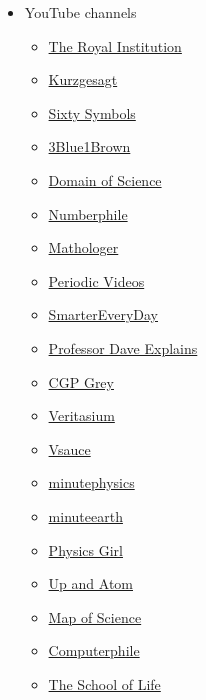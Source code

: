 \documentclass{article}
\begin{document}
\begin{itemize}
    \item YouTube channels
    \begin{itemize}
    \item \href{https://www.youtube.com/user/TheRoyalInstitution}{The Royal Institution}
    \item \href{https://www.youtube.com/user/Kurzgesagt}{Kurzgesagt}
    \item \href{https://www.youtube.com/user/sixtysymbols}{Sixty Symbols}
    \item \href{https://www.youtube.com/channel/UCYO_jab_esuFRV4b17AJtAw}{3Blue1Brown}
    \item \href{https://www.youtube.com/channel/UCxqAWLTk1CmBvZFPzeZMd9A}{Domain of Science}
    \item \href{https://www.youtube.com/channel/UCoxcjq-8xIDTYp3uz647V5A}{Numberphile}
    \item \href{https://www.youtube.com/channel/UC1_uAIS3r8Vu6JjXWvastJg}{Mathologer}
    \item \href{https://www.youtube.com/channel/UCtESv1e7ntJaLJYKIO1FoYw}{Periodic Videos}
    \item \href{https://www.youtube.com/channel/UC6107grRI4m0o2-emgoDnAA}{SmarterEveryDay}
    \item \href{https://www.youtube.com/channel/UC0cd_-e49hZpWLH3UIwoWRA}{Professor Dave Explains}
    \item \href{https://www.youtube.com/channel/UC2C_jShtL725hvbm1arSV9w}{CGP Grey}
    \item \href{https://www.youtube.com/user/1veritasium}{Veritasium}
    \item \href{https://www.youtube.com/channel/UC6nSFpj9HTCZ5t-N3Rm3-HA}{Vsauce}
    \item \href{https://www.youtube.com/user/minutephysics}{minutephysics}
    \item \href{https://www.youtube.com/minuteearth}{minuteearth}
    \item \href{https://www.youtube.com/channel/UC7DdEm33SyaTDtWYGO2CwdA}{Physics Girl}
    \item \href{https://www.youtube.com/channel/UCSIvk78tK2TiviLQn4fSHaw}{Up and Atom}
    \item \href{https://www.youtube.com/playlist?list=PLOYRlicwLG3St5aEm02ncj-sPDJwmojIS}{Map of Science}
    \item \href{https://www.youtube.com/channel/UC9-y-6csu5WGm29I7JiwpnA}{Computerphile}
    \item \href{https://www.youtube.com/channel/UC7IcJI8PUf5Z3zKxnZvTBog}{The School of Life}

\end{itemize}
\end{itemize}
\end{document}
